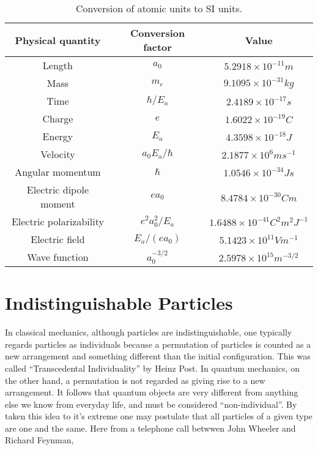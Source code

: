         \begin{table}
            \centering
            \caption{Conversion of atomic units to SI units.}
            \begin{tabular}{ccc} \hline
                Physical quantity & Conversion factor & Value \\ \hline
                Length  & $a_0$ & $5.2918 \times 10^{-11} m$ \\
                Mass    & $m_e$ & $9.1095 \times 10^{-31} kg$ \\
                Time    & $\hbar/E_a$ & $2.4189 \times 10^{-17} s$ \\
                Charge  & $e$   & $1.6022 \times 10^{-19} C$ \\
                Energy  & $E_a$ & $4.3598 \times 10^{-18} J$ \\
                Velocity& $a_0E_a/\hbar$ & $2.1877 \times 10^{6} ms^{-1}$ \\
                Angular momentum & $\hbar$ &  $1.0546 \times 10^{-34} Js$ \\
                Electric dipole moment & $ea_0$& $8.4784 \times 10^{-30} Cm$ \\
                Electric polarizability & $e^2a_0^2/E_a$ & $1.6488 \times 10^{-41} C^2m^2J^{-1}$ \\
                Electric field & $E_a/(ea_0)$ & $5.1423 \times 10^{11} Vm^{-1} $ \\
                Wave function & $a_0^{-3/2}$ & $2.5978 \times 10^{15} m^{-3/2}$ \\ \hline
            \end{tabular}
            \label{tab:atomic_units_conversion}
        \end{table}


    \section{Indistinguishable Particles}

        In classical mechanics, although particles are indistinguishable, one typically
        regards particles as individuals because a permutation of particles is counted as
        a new arrangement and something different than the initial configuration. 
        This was called ``Transcedental
        Individuality'' by Heinz Post\cite{post1963individuality}. In quantum mechanics, on 
        the other hand, a permutation is not regarded as giving rise to a new 
        arrangement. It follows that quantum objects are very different from anything else we
        know from everyday life, and must be considered ``non-individual''. By taken this idea
        to it's extreme one may postulate that all particles of a given type are one and the
        same. Here from a telephone call betwwen John Wheeler and Richard
        Feynman\cite{feynman1965nobel},

